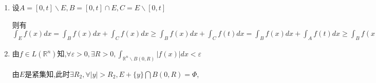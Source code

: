 \documentclass[UTF8, a4paper, 12pt, oneside, onecolumn]{article}
\numberwithin{equation}{section}
\numberwithin{figure}{section}
\numberwithin{table}{section}
\theoremstyle{nonumberplain}	%
\theoremstyle{plain}	%
\theoremstyle{plain}	%
\theoremstyle{plain}	%
\theoremstyle{plain}	%
\theoremstyle{nonumberplain}
\begin{document}
\begin{enumerate}
	与条件矛盾.同理可证明另外那两个集合测度为0.即证.
	
	注:$\displaystyle\{x\in \mathbb{R}^n:0<f(x)<1\}=\bigcup_{k=2}^{\infty}\{x\in\mathbb{R}^n:\frac{1}{k}<f(x)<1-\frac{1}{k}\}$
	\item 设$A=[0,t]\backslash E,B=[0,t]\cap E,C=E\backslash [0,t]$
	
	则有$\displaystyle\int_E f(x)dx=\int_B f(x)dx+\int_C f(x)dx\geqslant\int_B f(x)dx+\int_C f(t)dx=\int_B f(x)dx+\int_A f(t)dx\geqslant\int_B f(x)dx+\int_A f(x)dx=\int_{[0,t]} f(x)dx$
%	
%	
%	
%	
%	
%	
%	
%	
%	
%	
%	
%	
	
	
	
	\item 由$f\in L(\mathbb{R}^n)$知,$\displaystyle\forall \varepsilon>0,\exists R>0,\int_{\mathbb{R}^n\backslash B(0,R)}|f(x)|dx<\varepsilon$
	
	由$E$是紧集知,此时$\displaystyle\exists R_2,\forall |y|>R_2,E+\{y\}\bigcap B(0,R)=\Phi $,
	

\end{enumerate}
\end{document}

